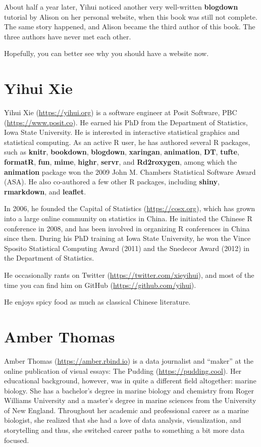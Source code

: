 \documentclass[
  12pt,
]{krantz}
\begin{document}
About half a year later, Yihui noticed another very well-written \textbf{blogdown} tutorial by Alison on her personal website, when this book was still not complete. The same story happened, and Alison became the third author of this book. The three authors have never met each other.

Hopefully, you can better see why you should have a website now.

\hypertarget{yihui-xie}{%
\section*{Yihui Xie}\label{yihui-xie}}


Yihui Xie (\url{https://yihui.org}) is a software engineer at Posit Software, PBC (\url{https://www.posit.co}). He earned his PhD from the Department of Statistics, Iowa State University. He is interested in interactive statistical graphics and statistical computing. As an active R user, he has authored several R packages, such as \textbf{knitr}, \textbf{bookdown}, \textbf{blogdown}, \textbf{xaringan}, \textbf{animation}, \textbf{DT}, \textbf{tufte}, \textbf{formatR}, \textbf{fun}, \textbf{mime}, \textbf{highr}, \textbf{servr}, and \textbf{Rd2roxygen}, among which the \textbf{animation} package won the 2009 John M. Chambers Statistical Software Award (ASA). He also co-authored a few other R packages, including \textbf{shiny}, \textbf{rmarkdown}, and \textbf{leaflet}.

In 2006, he founded the Capital of Statistics (\url{https://cosx.org}), which has grown into a large online community on statistics in China. He initiated the Chinese R conference in 2008, and has been involved in organizing R conferences in China since then. During his PhD training at Iowa State University, he won the Vince Sposito Statistical Computing Award (2011) and the Snedecor Award (2012) in the Department of Statistics.

He occasionally rants on Twitter (\url{https://twitter.com/xieyihui}), and most of the time you can find him on GitHub (\url{https://github.com/yihui}).

He enjoys spicy food as much as classical Chinese literature.

\hypertarget{amber-thomas}{%
\section*{Amber Thomas}\label{amber-thomas}}


Amber Thomas (\url{https://amber.rbind.io}) is a data journalist and ``maker'' at the online publication of visual essays: The Pudding (\url{https://pudding.cool}). Her educational background, however, was in quite a different field altogether: marine biology. She has a bachelor's degree in marine biology and chemistry from Roger Williams University and a master's degree in marine sciences from the University of New England. Throughout her academic and professional career as a marine biologist, she realized that she had a love of data analysis, visualization, and storytelling and thus, she switched career paths to something a bit more data focused.
\end{document}
